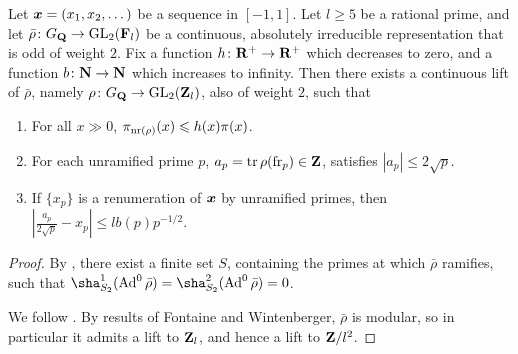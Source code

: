 \begin{theorem}
Let ${\boldsymbol x}=(x_1,x_2,\dots)$ be a sequence in $[-1,1]$. Let $l\geqslant 5$ be a 
rational prime, and let $\bar\rho\colon G_{\mathbf{Q}} \to \operatorname{GL}_2(\mathbf{F}_l)$ be a continuous, 
absolutely irreducible representation that is odd of weight $2$. Fix a function 
$h\colon \mathbf{R}^+ \to \mathbf{R}^+$ which decreases to zero, and a function 
$b\colon \mathbf{N} \to \mathbf{N}$ which increases to infinity. Then there exists a 
continuous lift of $\bar\rho$, namely  $\rho\colon G_{\mathbf{Q}}\to \operatorname{GL}_2(\mathbf{Z}_l)$, also 
of weight $2$, such that 
\begin{enumerate}
\item
For all $x\gg 0$, $\pi_{\mathrm{nr}(\rho)}(x) \leqslant h(x) \pi(x)$.

\item
For each unramified prime $p$, $a_p = \operatorname{tr} \rho(\mathrm{fr}_p)\in \mathbf{Z}$, satisfies 
$|a_p| \leqslant 2\sqrt p$.

\item
If $\{x_p\}$ is a renumeration of ${\boldsymbol x}$ by unramified primes, then 
$\left|\frac{a_p}{2\sqrt p} - x_p\right| \leqslant  lb(p) p^{-1/2}$. 
\end{enumerate}
\end{theorem}
\begin{proof}
By \cite[Lem.~6]{khare-larsen-ramakrishna-2005}, there exist a finite set 
$S$, containing the primes at which $\bar\rho$ ramifies, such that 
$\sha_{S_2}^1(\Ad^0\bar\rho) = \sha_{S_2}^2(\Ad^0\bar\rho) = 0$. 

We follow \cite{khare-larsen-ramakrishna-2005,pande-2011}. By results of 
Fontaine and Wintenberger, $\bar\rho$ is modular, so in particular it admits a 
lift to $\mathbf{Z}_l$, and hence a lift to $\mathbf{Z}/l^2$. 


\end{proof}
